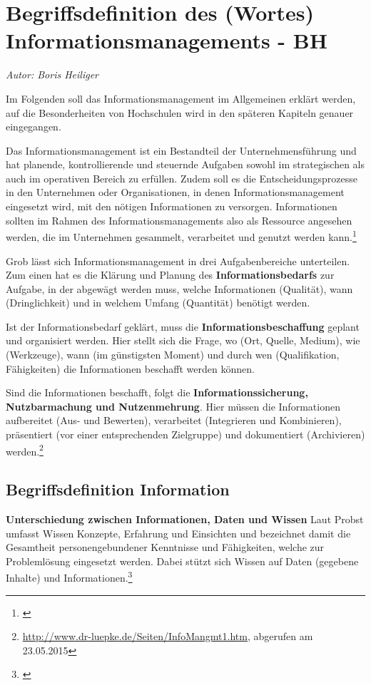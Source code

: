 \section{Begriffsdefinition des (Wortes) Informationsmanagements - BH}
\textit{Autor: Boris Heiliger}

Im Folgenden soll das Informationsmanagement im Allgemeinen erklärt werden, auf die Besonderheiten von Hochschulen wird in den späteren Kapiteln genauer eingegangen.

Das Informationsmanagement ist ein Bestandteil der Unternehmensführung und hat planende, kontrollierende und steuernde Aufgaben sowohl im strategischen als auch im operativen Bereich zu erfüllen. Zudem soll es die Entscheidungsprozesse in den Unternehmen oder Organisationen, in denen Informationsmanagement eingesetzt wird, mit den nötigen Informationen zu versorgen. Informationen sollten im Rahmen des Informationsmanagements also als Ressource angesehen werden, die im Unternehmen gesammelt, verarbeitet und genutzt werden kann.\footnote{\cite[65-68]{voss_informationsmanagement_2001}}

Grob lässt sich Informationsmanagement in drei Aufgabenbereiche unterteilen. Zum einen hat es die Klärung und Planung des \textbf{Informationsbedarfs} zur Aufgabe, in der abgewägt werden muss, welche Informationen (Qualität), wann (Dringlichkeit) und in welchem Umfang (Quantität) benötigt werden.

Ist der Informationsbedarf geklärt, muss die \textbf{Informationsbeschaffung} geplant 
und organisiert werden. Hier stellt sich die Frage, wo (Ort, Quelle, Medium), wie (Werkzeuge), wann (im günstigsten Moment) und durch wen (Qualifikation, Fähigkeiten) die Informationen beschafft werden können.

Sind die Informationen beschafft, folgt die \textbf{Informationssicherung, Nutzbarmachung und Nutzenmehrung}. Hier müssen die Informationen aufbereitet (Aus- und Bewerten), verarbeitet (Integrieren und Kombinieren), präsentiert (vor einer entsprechenden Zielgruppe) und dokumentiert (Archivieren) werden.\footnote{\url{http://www.dr-luepke.de/Seiten/InfoMangmt1.htm}, abgerufen am 23.05.2015}

\subsection{Begriffsdefinition Information}

\textbf{Unterschiedung zwischen Informationen, Daten und Wissen}
Laut Probst umfasst Wissen Konzepte, Erfahrung und Einsichten und bezeichnet damit die Gesamtheit personengebundener Kenntnisse und Fähigkeiten, welche zur Problemlösung eingesetzt werden. Dabei stützt sich Wissen auf Daten (gegebene Inhalte) und Informationen.\footnote{\cite{probst_wissen_2006}}

